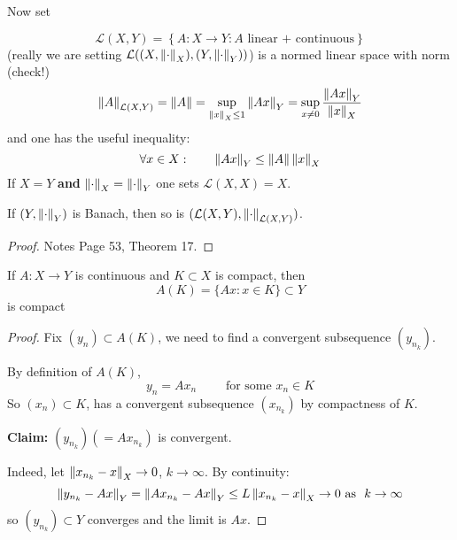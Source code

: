 \documentclass{article}
\begin{document}
Now set 

$$
\mathcal{L}(X, Y) = \left\{A: X \to Y: A \text{\ linear\ +\ continuous} \right\}
$$
(really we are setting $\mathcal{L}((X, \left\|{\cdot}\right\|_X), (Y, \left\|{\cdot}\right\|_Y))$)  
is a normed linear space with norm (check!)  
$$
\left\|{A}\right\|_{\mathcal{L}(X, Y)} = \left\|{A}\right\| = \sup_{\left\|{x}\right\|_X\leq 1} \left\|{Ax}\right\|_Y = \sup_{x \neq 0} \frac{\left\|{Ax}\right\|_Y}{\left\|{x}\right\|_X}
$$ 
and one has the useful inequality:  
$$
\forall x \in X: \qquad \left\|{Ax}\right\|_Y \leq \left\|{A}\right\| \left\|{x}\right\|_X
$$
If $X=Y$ \textbf{and} $\left\|{\cdot}\right\|_X = \left\|{\cdot}\right\|_Y$ one sets $\mathcal{L}(X, X)=X$.  

\begin{theorem}
    If $(Y, \left\|{\cdot}\right\|_Y)$ is Banach, then so is $(\mathcal{L}(X, Y), \left\|{\cdot}\right\|_{\mathcal{L}(X, Y)})$.  
\end{theorem}
\begin{proof}
    Notes Page 53, Theorem 17.
\end{proof}

\begin{corollary}
    If $A:X \to Y$ is continuous and $K\subset X$ is compact, then  
    $$
    A(K) = \{Ax: x\in K\} \subset Y
    $$
    is compact
\end{corollary}
\begin{proof}
    Fix $(y_n) \subset A(K)$, we need to find a convergent subsequence $(y_{n_k})$.  

    By definition of $A(K)$,  
    $$
    y_n = Ax_n \qquad \text{\ for\ some\ }x_n \in K
    $$  
    So $(x_n) \subset K$, has a convergent subsequence $(x_{n_k})$ by compactness of $K$.  

    \textbf{Claim:} $(y_{n_k})(=Ax_{n_k})$ is convergent.  

    Indeed, let $\left\|{x_{n_k}-x}\right\|_X \to 0$, $k\to \infty$. By continuity:  
    $$
    \left\|{y_{n_k}-Ax}\right\|_Y = \left\|{Ax_{n_k}-Ax}\right\|_Y \leq L \left\|{x_{n_k}-x}\right\|_X \to 0 \text{\ as \ } k \to \infty
    $$
    so $(y_{n_k}) \subset Y$ converges and the limit is $Ax$.
\end{proof}
\end{document}
